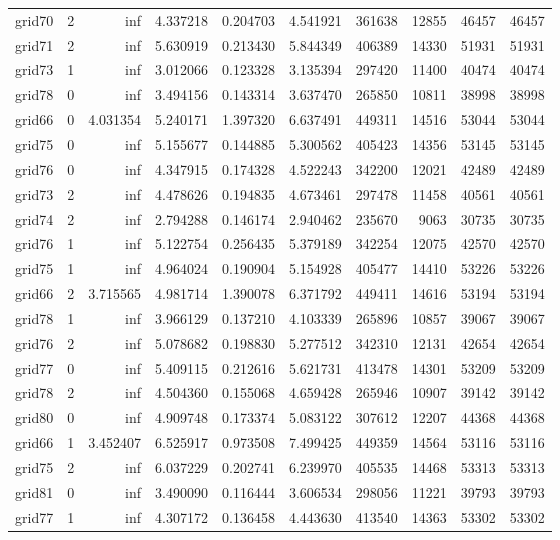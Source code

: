 \begin{longtable}{|l|r|r|r|r|r|r|r|r|r|}
grid70 & 2 & inf & 4.337218 & 0.204703 & 4.541921 & 361638 & 12855 & 46457 & 46457 \\
grid71 & 2 & inf & 5.630919 & 0.213430 & 5.844349 & 406389 & 14330 & 51931 & 51931 \\
grid73 & 1 & inf & 3.012066 & 0.123328 & 3.135394 & 297420 & 11400 & 40474 & 40474 \\
grid78 & 0 & inf & 3.494156 & 0.143314 & 3.637470 & 265850 & 10811 & 38998 & 38998 \\
grid66 & 0 & 4.031354 & 5.240171 & 1.397320 & 6.637491 & 449311 & 14516 & 53044 & 53044 \\
grid75 & 0 & inf & 5.155677 & 0.144885 & 5.300562 & 405423 & 14356 & 53145 & 53145 \\
grid76 & 0 & inf & 4.347915 & 0.174328 & 4.522243 & 342200 & 12021 & 42489 & 42489 \\
grid73 & 2 & inf & 4.478626 & 0.194835 & 4.673461 & 297478 & 11458 & 40561 & 40561 \\
grid74 & 2 & inf & 2.794288 & 0.146174 & 2.940462 & 235670 & 9063 & 30735 & 30735 \\
grid76 & 1 & inf & 5.122754 & 0.256435 & 5.379189 & 342254 & 12075 & 42570 & 42570 \\
grid75 & 1 & inf & 4.964024 & 0.190904 & 5.154928 & 405477 & 14410 & 53226 & 53226 \\
grid66 & 2 & 3.715565 & 4.981714 & 1.390078 & 6.371792 & 449411 & 14616 & 53194 & 53194 \\
grid78 & 1 & inf & 3.966129 & 0.137210 & 4.103339 & 265896 & 10857 & 39067 & 39067 \\
grid76 & 2 & inf & 5.078682 & 0.198830 & 5.277512 & 342310 & 12131 & 42654 & 42654 \\
grid77 & 0 & inf & 5.409115 & 0.212616 & 5.621731 & 413478 & 14301 & 53209 & 53209 \\
grid78 & 2 & inf & 4.504360 & 0.155068 & 4.659428 & 265946 & 10907 & 39142 & 39142 \\
grid80 & 0 & inf & 4.909748 & 0.173374 & 5.083122 & 307612 & 12207 & 44368 & 44368 \\
grid66 & 1 & 3.452407 & 6.525917 & 0.973508 & 7.499425 & 449359 & 14564 & 53116 & 53116 \\
grid75 & 2 & inf & 6.037229 & 0.202741 & 6.239970 & 405535 & 14468 & 53313 & 53313 \\
grid81 & 0 & inf & 3.490090 & 0.116444 & 3.606534 & 298056 & 11221 & 39793 & 39793 \\
grid77 & 1 & inf & 4.307172 & 0.136458 & 4.443630 & 413540 & 14363 & 53302 & 53302 \\

\end{longtable}
